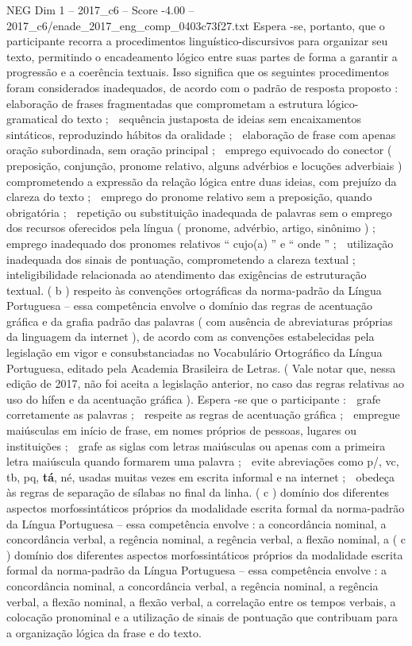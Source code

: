 \begin{textsample}{NEG Dim 1 – 2017\_c6 – Score -4.00 – 2017\_c6/enade\_2017\_eng\_comp\_0403c73f27.txt}
Espera -se, portanto, que o participante recorra a procedimentos linguístico-discursivos para organizar seu texto, permitindo o encadeamento lógico entre suas partes de forma a garantir a progressão e a coerência textuais.
Isso significa que os seguintes procedimentos foram considerados inadequados, de acordo com o padrão de resposta proposto :  elaboração de frases fragmentadas que comprometam a estrutura lógico-gramatical do texto ;  sequência justaposta de ideias sem encaixamentos sintáticos, reproduzindo hábitos da oralidade ;  elaboração de frase com apenas oração subordinada, sem oração principal ;  emprego equivocado do conector ( preposição, conjunção, pronome relativo, alguns advérbios e locuções adverbiais ) comprometendo a expressão da relação lógica entre duas ideias, com prejuízo da clareza do texto ;  emprego do pronome relativo sem a preposição, quando obrigatória ;  repetição ou substituição inadequada de palavras sem o emprego dos recursos oferecidos pela língua ( pronome, advérbio, artigo, sinônimo ) ;  emprego inadequado dos pronomes relativos “ cujo(a) ” e “ onde ” ;  utilização inadequada dos sinais de pontuação, comprometendo a clareza textual ;  inteligibilidade relacionada ao atendimento das exigências de estruturação textual. ( b ) respeito às convenções ortográficas da norma-padrão da Língua Portuguesa – essa competência envolve o domínio das regras de acentuação gráfica e da grafia padrão das palavras ( com ausência de abreviaturas próprias da linguagem da internet ), de acordo com as convenções estabelecidas pela legislação em vigor e consubstanciadas no Vocabulário Ortográfico da Língua Portuguesa, editado pela Academia Brasileira de Letras. ( Vale notar que, nessa edição de 2017, não foi aceita a legislação anterior, no caso das regras relativas ao uso do hífen e da acentuação gráfica ).
Espera -se que o participante :  grafe corretamente as palavras ;  respeite as regras de acentuação gráfica ;  empregue maiúsculas em início de frase, em nomes próprios de pessoas, lugares ou instituições ;  grafe as siglas com letras maiúsculas ou apenas com a primeira letra maiúscula quando formarem uma palavra ;  evite abreviações como p/, vc, tb, pq, \textbf{tá}, né, usadas muitas vezes em escrita informal e na internet ;  obedeça às regras de separação de sílabas no final da linha. ( c ) domínio dos diferentes aspectos morfossintáticos próprios da modalidade escrita formal da norma-padrão da Língua Portuguesa – essa competência envolve : a concordância nominal, a concordância verbal, a regência nominal, a regência verbal, a flexão nominal, a ( c ) domínio dos diferentes aspectos morfossintáticos próprios da modalidade escrita formal da norma-padrão da Língua Portuguesa – essa competência envolve : a concordância nominal, a concordância verbal, a regência nominal, a regência verbal, a flexão nominal, a flexão verbal, a correlação entre os tempos verbais, a colocação pronominal e a utilização de sinais de pontuação que contribuam para a organização lógica da frase e do texto.

\end{textsample}
